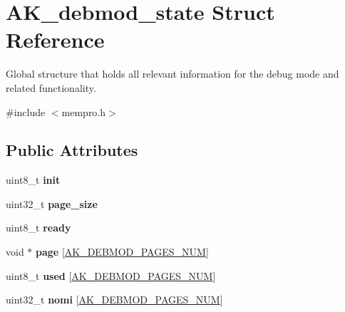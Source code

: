\hypertarget{structAK__debmod__state}{}\section{A\+K\+\_\+debmod\+\_\+state Struct Reference}
\label{structAK__debmod__state}


Global structure that holds all relevant information for the debug mode and related functionality.  




{\ttfamily \#include $<$mempro.\+h$>$}

\subsection*{Public Attributes}
\begin{DoxyCompactItemize}
\item 
\mbox{\label{structAK__debmod__state_a8d757c6d2fc5c400db32227cf187032a}} 
uint8\+\_\+t {\bfseries init}
\item 
\mbox{\label{structAK__debmod__state_a1eaac396a172048846a1cef55f35ec2b}} 
uint32\+\_\+t {\bfseries page\+\_\+size}
\item 
\mbox{\label{structAK__debmod__state_ad42920c0ed7bf5a018cbfffb41680955}} 
uint8\+\_\+t {\bfseries ready}
\item 
\mbox{\label{structAK__debmod__state_af5c1df6f4673acf904537e7cdaf0fcdf}} 
void $\ast$ {\bfseries page} \mbox{[}\hyperlink{mempro_8h_a51cd45bb30d86f207631ecef36db7f14}{A\+K\+\_\+\+D\+E\+B\+M\+O\+D\+\_\+\+P\+A\+G\+E\+S\+\_\+\+N\+UM}\mbox{]}
\item 
\mbox{\label{structAK__debmod__state_adb34e335c766db4ba38902568b25280d}} 
uint8\+\_\+t {\bfseries used} \mbox{[}\hyperlink{mempro_8h_a51cd45bb30d86f207631ecef36db7f14}{A\+K\+\_\+\+D\+E\+B\+M\+O\+D\+\_\+\+P\+A\+G\+E\+S\+\_\+\+N\+UM}\mbox{]}
\item 
\mbox{\label{structAK__debmod__state_ac6986a603741fde8f5d412bc576920c2}} 
uint32\+\_\+t {\bfseries nomi} \mbox{[}\hyperlink{mempro_8h_a51cd45bb30d86f207631ecef36db7f14}{A\+K\+\_\+\+D\+E\+B\+M\+O\+D\+\_\+\+P\+A\+G\+E\+S\+\_\+\+N\+UM}\mbox{]}

\end{DoxyCompactItemize}
